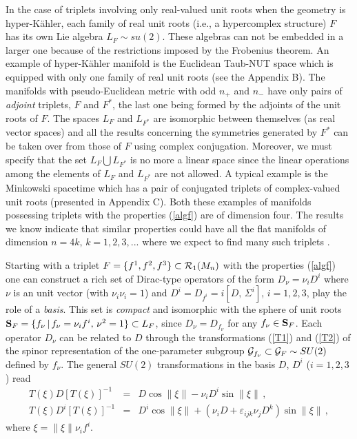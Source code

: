 \documentclass[a4paper,12pt]{article}
\begin{document}
In the case of triplets involving only real-valued unit roots when the 
geometry is  hyper-K\" ahler, each family of real unit roots (i.e., a  
hypercomplex structure) $F$ has its own Lie algebra $L_F\sim su(2)$. These 
algebras can not be embedded in a larger one because of the restrictions 
imposed by the Frobenius theorem.  An example of hyper-K\" ahler manifold 
is the Euclidean Taub-NUT space which is equipped with only one family of 
real unit roots 
\cite{CV, CV1} (see the Appendix B). The manifolds with 
pseudo-Euclidean metric 
with odd $n_{+}$ and $n_{-}$ have only pairs of 
{\em adjoint} triplets, $F$ 
and $F^*$, the last one being formed by the 
adjoints of the unit roots of $F$. 
The spaces 
$L_F$ and $L_{F^*}$ are isomorphic between themselves (as real vector spaces) 
and all the results concerning the symmetries generated by $F^*$ can be taken 
over from those of $F$ using complex conjugation. Moreover, we must specify 
that the set $L_{F}\bigcup L_{F^*}$ is no more a linear space since the linear 
operations among the elements of $L_F$ and $L_{F^*}$ are not allowed. A typical 
example is the Minkowski spacetime which has a pair of conjugated triplets of 
complex-valued unit roots \cite{K2} (presented in Appendix C). Both these 
examples of manifolds possessing triplets with the properties (\ref{algf}) are 
of dimension four. The results we know  indicate that similar properties could 
have all the flat manifolds of dimension $n=4k,\, k=1,2,3,...$ where we expect 
to find many such triplets \cite{GM}. 


Starting with a triplet $F=\{f^1,f^2,f^3\}\subset {\cal R}_1(M_n)$ with 
the properties (\ref{algf}) one can construct a rich set of Dirac-type 
operators of the form $D_{\nu}=\nu_i D^i$ where $\nu$ is an unit vector 
(with $\nu_i\nu_i=1$) and $D^i= D_{f^i}=i[D,\,\Sigma^i]$, $i=1,2,3$, play the 
role of a {\em basis}. This set is {\em compact} and isomorphic with the 
sphere of unit roots ${\bf S}_{F}=\{f_{\nu}\,|\,f_{\nu}=\nu_i f^i,\, \nu^2=1\}
\subset L_F$, since $D_{\nu}=D_{f_{\nu}}$ for any $f_{\nu}\in {\bf S}_F$. 
Each operator $D_{\nu}$ can be related to $D$ through the transformations  
(\ref{T1}) and (\ref{T2}) of the spinor representation of the one-parameter 
subgroup ${\cal G}_{f_{\nu}}\subset {\cal G}_F \sim SU(2)$  defined by 
$f_{\nu}$. The general $SU(2)$ transformations in the basis $D$, $D^i$ 
($i=1,2,3$) read
\begin{eqnarray}  
T(\xi)D[T(\xi)]^{-1}&=&D\cos \|\xi\|-\nu_i D^i\sin\|\xi\|\,,\label{TDT10}\\ 
T(\xi)D^i[T(\xi)]^{-1}&=&D^i\cos \|\xi\|+ 
(\nu_i D+\varepsilon_{ijk} \nu_j D^k)\sin\|\xi\|\,, \label{TDT20}
\end{eqnarray}
where $\xi=\|\xi\| \nu_i f^i$. 
\end{document}
